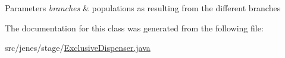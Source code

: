 \begin{DoxyParams}{Parameters}
{\em branches} & populations as resulting from the different branches \\
\hline
\end{DoxyParams}


The documentation for this class was generated from the following file\-:\begin{DoxyCompactItemize}
\item 
src/jenes/stage/\hyperlink{_exclusive_dispenser_8java}{Exclusive\-Dispenser.\-java}\end{DoxyCompactItemize}

